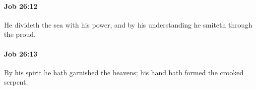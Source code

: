 		\paragraph{Job 26:12} %
			\label{JOB-26-12}

			He divideth the sea with his power, and by his understanding he smiteth through the proud.


		\paragraph{Job 26:13} %
			\label{JOB-26-13}

			By his spirit he hath garnished the heavens; his hand hath formed the crooked serpent.


